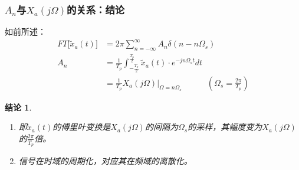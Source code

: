 \documentclass[notheorems,compress,mathserif,table]{beamer}
\newtheorem{jielun}{结论}
\begin{document}
  
\begin{frame}[shrink]\frametitle{$A_n$与$X_a(j\Omega)$的关系：结论}%
如前所述：
\begin{equation*}
\begin{split}
 FT\big[\tilde{x}_a(t)\big]  &= 2\pi \sum_{n=-\infty}^{\infty} A_n \delta(n-n\Omega_s) \\
A_n     &= \frac{1}{T_p}\int_{-\frac{T_p}{2}}^{\frac{T_p}{2}}\tilde{x}_a(t)\cdot e^{-jn\Omega_s t}dt\\
			&= \frac{1}{T_p}X_a(j\Omega)\Big|_{\Omega=n\Omega_s}\quad\quad\quad(\Omega_s = \frac{2\pi}{T_p})
\end{split}
\end{equation*}

\begin{jielun}	
 \begin{enumerate}
     \item [(1)]  即$\tilde{x}_a(t)$的傅里叶变换是$X_a(j\Omega)$的间隔为$ \Omega_s  $的采样，其幅度变为$X_a(j\Omega)$的$ \frac{2\pi}{T_p}$倍。
     \item [(2)] 信号在时域的周期化，对应其在频域的离散化。
    \end{enumerate}
\end{jielun}
\end{frame}
\end{document}
